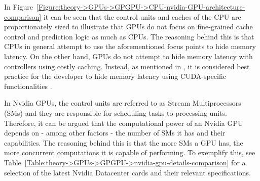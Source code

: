 In Figure~\ref{Figure:theory->GPUs->GPGPU->CPU-nvidia-GPU-architecture-comparison} it can be seen that the control units and caches of the CPU are proportionately sized to illustrate that GPUs do not focus on fine-grained cache control and prediction logic as much as CPUs.
The reasoning behind this is that CPUs in general attempt to use the aforementioned focus points to hide memory latency.
On the other hand, GPUs do not attempt to hide memory latency with controllers using costly caching.
Instead, as mentioned in  \cite{NVIDIADec2022}, it is considered best practice for the developer to hide memory latency using CUDA-specific functionalities \cite{Sanglard2May2020}.

In Nvidia GPUs, the control units are referred to as Stream Multiprocessors (SMs) and they are responsible for scheduling tasks to processing units.
Therefore, it can be argued that the computational power of an Nvidia GPU depends on - among other factors - the number of SMs it has and their capabilities.
The reasoning behind this is that the more SMs a GPU has, the more concurrent computations it is capable of performing.
To exemplify this, see Table~\ref{Table:theory->GPUs->GPGPU->nvidia-gpu-details-comparison} for a selection of the latest Nvidia Datacenter cards and their relevant specifications.

